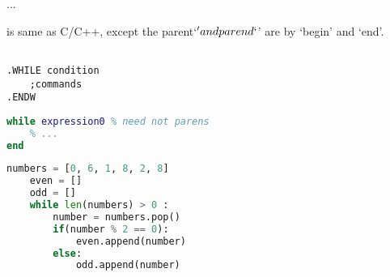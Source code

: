 


...

 is same as C/C++, except the parent`\(' and parend`\)' are by `begin' and `end'.


\lstset{style=GlobalASMx86}
\begin{lstlisting}[language={[x86masm]Assembler}]

.WHILE condition
	;commands
.ENDW
\end{lstlisting}

\begin{lstlisting}[language=MATLAB]
while expression0 % need not parens
	% ...
end
\end{lstlisting}

\begin{lstlisting}[language=Python]
	numbers = [0, 6, 1, 8, 2, 8]
	even = []
	odd = []
	while len(numbers) > 0 :
		number = numbers.pop()
		if(number % 2 == 0):
			even.append(number)
		else:
			odd.append(number)
\end{lstlisting}